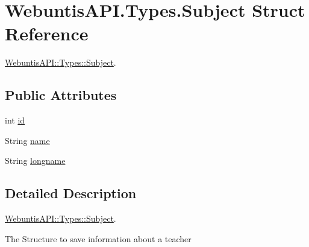 \hypertarget{struct_webuntis_a_p_i_1_1_types_1_1_subject}{\section{Webuntis\-A\-P\-I.\-Types.\-Subject Struct Reference}
\label{struct_webuntis_a_p_i_1_1_types_1_1_subject}
}


\hyperlink{struct_webuntis_a_p_i_1_1_types_1_1_subject}{Webuntis\-A\-P\-I\-::\-Types\-::\-Subject}.  


\subsection*{Public Attributes}
\begin{DoxyCompactItemize}
\item 
int \hyperlink{struct_webuntis_a_p_i_1_1_types_1_1_subject_ae9e339f8fc82608d03dcd222fc03e81a}{id}
\item 
String \hyperlink{struct_webuntis_a_p_i_1_1_types_1_1_subject_a52c74e223123db5b7add56d0a6ad0708}{name}
\item 
String \hyperlink{struct_webuntis_a_p_i_1_1_types_1_1_subject_a07f2f0280c83cc595fcd18f8c291d9a0}{longname}
\end{DoxyCompactItemize}


\subsection{Detailed Description}
\hyperlink{struct_webuntis_a_p_i_1_1_types_1_1_subject}{Webuntis\-A\-P\-I\-::\-Types\-::\-Subject}. 

The Structure to save information about a teacher 

